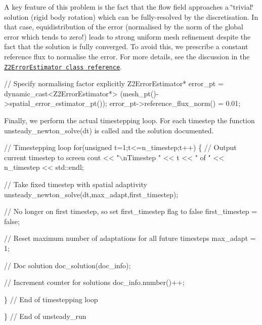 A key feature of this problem is the fact that the flow field approaches a \char`\"{}trivial\char`\"{} solution (rigid body rotation) which can be fully-\/resolved by the discretisation. In that case, equidistribution of the error (normalised by the norm of the global error which tends to zero!) leads to strong uniform mesh refinement despite the fact that the solution is fully converged. To avoid this, we prescribe a constant reference flux to normalise the error. For more details, see the discussion in the \href{../../../the_data_structure/html/classoomph_1_1Z2ErrorEstimator.html}{\tt {\ttfamily Z2\+Error\+Estimator} class reference}.


\begin{DoxyCodeInclude}
 \textcolor{comment}{// Specify normalising factor explicitly}
 Z2ErrorEstimator* error\_pt = \textcolor{keyword}{dynamic\_cast<}Z2ErrorEstimator*\textcolor{keyword}{>}
  (mesh\_pt()->spatial\_error\_estimator\_pt());
 error\_pt->reference\_flux\_norm() = 0.01;

\end{DoxyCodeInclude}


Finally, we perform the actual timestepping loop. For each timestep the function {\ttfamily unsteady\+\_\+newton\+\_\+solve(dt)} is called and the solution documented.


\begin{DoxyCodeInclude}
 \textcolor{comment}{// Timestepping loop}
 \textcolor{keywordflow}{for}(\textcolor{keywordtype}{unsigned} t=1;t<=n\_timestep;t++)
  \{
   \textcolor{comment}{// Output current timestep to screen}
   cout << \textcolor{stringliteral}{"\(\backslash\)nTimestep "} << t << \textcolor{stringliteral}{" of "} << n\_timestep << std::endl;

   \textcolor{comment}{// Take fixed timestep with spatial adaptivity}
   unsteady\_newton\_solve(dt,max\_adapt,first\_timestep);
   
   \textcolor{comment}{// No longer on first timestep, so set first\_timestep flag to false}
   first\_timestep = \textcolor{keyword}{false}; 

   \textcolor{comment}{// Reset maximum number of adaptations for all future timesteps}
   max\_adapt = 1;
   
   \textcolor{comment}{// Doc solution}
   doc\_solution(doc\_info);
   
   \textcolor{comment}{// Increment counter for solutions }
   doc\_info.number()++;
   
  \} \textcolor{comment}{// End of timestepping loop}
 
\} \textcolor{comment}{// End of unsteady\_run}

\end{DoxyCodeInclude}




